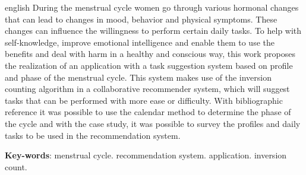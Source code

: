 \begin{resumo}[Abstract]
  \begin{otherlanguage*}{english}
   During the menstrual cycle women go through various hormonal changes that can lead to
 changes in mood, behavior and physical symptoms. These changes can influence 
 the willingness to perform certain daily tasks. To help with self-knowledge, improve emotional 
 intelligence and enable them to use the benefits and deal with
 harm in a healthy and conscious way, this work proposes the realization of an 
 application with a task suggestion system based on
 profile and phase of the menstrual cycle. This system makes use of the inversion counting algorithm
 in a collaborative recommender system, which will suggest tasks
 that can be performed with more ease or difficulty. With bibliographic reference
 it was possible to use the calendar method to determine the phase of the cycle and with the
 case study, it was possible to survey the profiles and daily tasks to be used in the
 recommendation system.
    \vspace{\onelineskip}
  
    \noindent 
    \textbf{Key-words}: 
    menstrual cycle. recommendation system. application. inversion count.
  \end{otherlanguage*}
 \end{resumo}
 